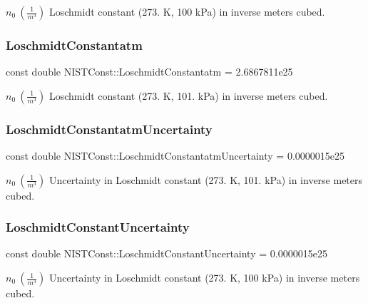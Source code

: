 $n_0 \ (\frac{1}{m^3})$ Loschmidt constant (273. K, 100 k\+Pa) in inverse meters cubed. \mbox{\label{group___loschmidt_constant_ga1442f26c5c9f899f74ef7b546a41c461}} 
\subsubsection{\texorpdfstring{Loschmidt\+Constantatm}{LoschmidtConstantatm}}
{\footnotesize\ttfamily const double N\+I\+S\+T\+Const\+::\+Loschmidt\+Constantatm = 2.\+6867811e25}

$n_0 \ (\frac{1}{m^3})$ Loschmidt constant (273. K, 101. k\+Pa) in inverse meters cubed. \mbox{\label{group___loschmidt_constant_gaed8885c8d2d27d9d8b88c271e0022228}} 
\subsubsection{\texorpdfstring{Loschmidt\+Constantatm\+Uncertainty}{LoschmidtConstantatmUncertainty}}
{\footnotesize\ttfamily const double N\+I\+S\+T\+Const\+::\+Loschmidt\+Constantatm\+Uncertainty = 0.\+0000015e25}

$n_0 \ (\frac{1}{m^3})$ Uncertainty in Loschmidt constant (273. K, 101. k\+Pa) in inverse meters cubed. \mbox{\label{group___loschmidt_constant_gae1bf8845a08d0554f1045083a143c30a}} 
\subsubsection{\texorpdfstring{Loschmidt\+Constant\+Uncertainty}{LoschmidtConstantUncertainty}}
{\footnotesize\ttfamily const double N\+I\+S\+T\+Const\+::\+Loschmidt\+Constant\+Uncertainty = 0.\+0000015e25}

$n_0 \ (\frac{1}{m^3})$ Uncertainty in Loschmidt constant (273. K, 100 k\+Pa) in inverse meters cubed. 